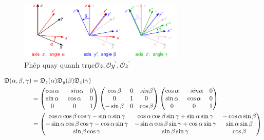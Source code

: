   \begin{figure}[hc]
  \centering
  \includegraphics[width=0.70\textwidth]{./Figures/Selection_001.png}
  \caption[phép quay]{Phép quay quanh trục$\mathcal{O}z,\mathcal{O}y^{'},\mathcal{O}z^{'}$ }
  \label{fig:phép quay}
  \end{figure}
  \begin{align}
  \mathfrak{D}(\alpha,\beta,\gamma)&=
  \mathfrak{D}_z(\alpha)\mathfrak{D}_y(\beta)\mathfrak{D}_z(\gamma)\notag\\
  &=\begin{pmatrix}
  \cos\alpha &-sin\alpha & 0\\
  \sin\alpha &\cos\alpha &0\\
  0 &0 &1
  \end{pmatrix}
  \begin{pmatrix}
  \cos\beta &0 &sin\beta\\
  0 &1 & 0\\
  -\sin\beta &0 &\cos\beta
  \end{pmatrix}
  \begin{pmatrix}
  \cos\alpha &-sin\alpha & 0\\
  \sin\alpha &\cos\alpha &0\\
  0 &0 &1
  \end{pmatrix}\\
  &=\begin{pmatrix}
  \cos\alpha\cos\beta\cos\gamma -\sin\alpha\sin\gamma & \cos\alpha\cos\beta\sin\gamma +\sin\alpha\sin\gamma & -\cos\alpha\sin\beta \\
  -\sin\alpha\cos\beta\cos\gamma -\cos\alpha\sin\gamma & -\sin\alpha\cos\beta\sin\gamma +\cos\alpha\sin\gamma &\sin\alpha\sin\beta \\
  \sin\beta\cos\gamma &\sin\beta\sin\gamma & \cos\beta \notag
  \end{pmatrix}
  \end{align}

